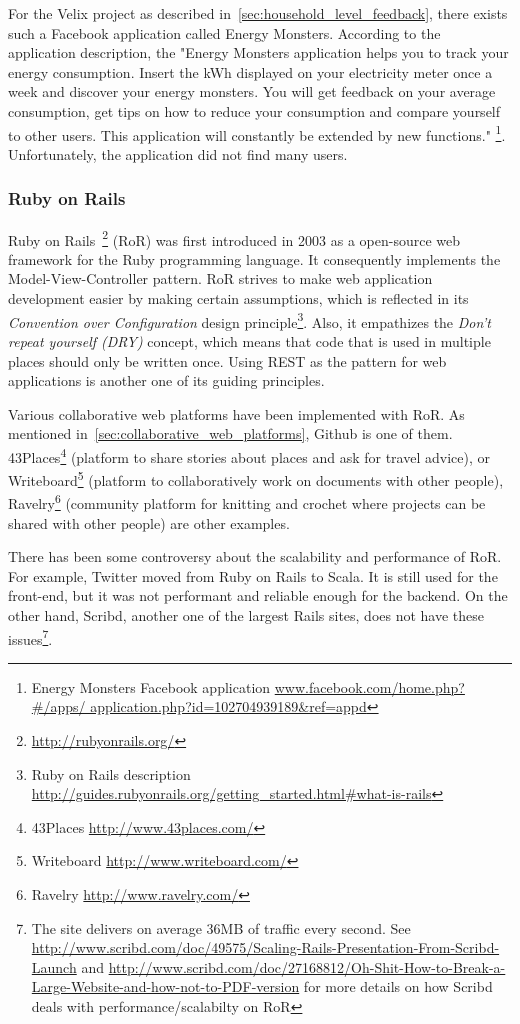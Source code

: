 For the Velix project as described in~\ref{sec:household_level_feedback}, there exists such a Facebook application called Energy Monsters. According to the application description, the "Energy Monsters application helps you to track your energy consumption. Insert the kWh displayed on your electricity meter once a week and discover your energy monsters. You will get feedback on your average consumption, get tips on how to reduce your consumption and compare yourself to other users. This application will constantly be extended by new functions."   \footnote{Energy Monsters Facebook application \url{www.facebook.com/home.php?#/apps/ application.php?id=102704939189&ref=appd}}. Unfortunately, the application did not find many users. 

\subsubsection{Ruby on Rails}
Ruby on Rails~\footnote{\url{http://rubyonrails.org/}} (RoR) was first introduced in 2003 as a open-source web framework for the Ruby programming language. It consequently implements the Model-View-Controller pattern. 
RoR strives to make web application development easier by making certain assumptions, which is reflected in its \textit{Convention over Configuration} design principle\footnote{Ruby on Rails description \url{http://guides.rubyonrails.org/getting_started.html#what-is-rails}}. Also, it empathizes the \textit{Don't repeat yourself (DRY)} concept, which means that code that is used in multiple places should only be written once. 
Using REST as the pattern for web applications is another one of its guiding principles.

Various collaborative web platforms have been implemented with RoR. As mentioned in~\ref{sec:collaborative_web_platforms}, Github is one of them. 43Places\footnote{43Places \url{http://www.43places.com/}} (platform to share stories about places and ask for travel advice), or Writeboard\footnote{Writeboard \url{http://www.writeboard.com/}} (platform to collaboratively work on documents with other people), Ravelry\footnote{Ravelry \url{http://www.ravelry.com/}} (community platform for knitting and crochet where projects can be shared with other people) are other examples.

There has been some controversy about the scalability and performance of RoR. For example, Twitter moved from Ruby on Rails to Scala. It is still used for the front-end, but it was not performant and reliable enough for the backend\cite{twitter_ruby_scala}. On the other hand, Scribd, another one of the largest Rails sites, does not have these issues\footnote{The site delivers on average 36MB of traffic every second. See \url{http://www.scribd.com/doc/49575/Scaling-Rails-Presentation-From-Scribd-Launch} and \url{http://www.scribd.com/doc/27168812/Oh-Shit-How-to-Break-a-Large-Website-and-how-not-to-PDF-version} for more details on how Scribd deals with performance/scalabilty on RoR}.

